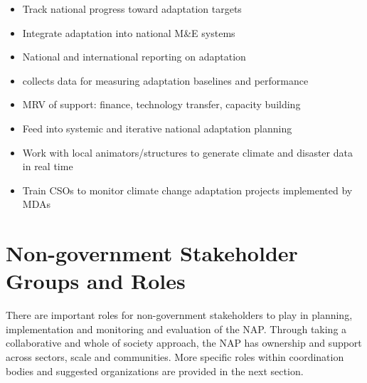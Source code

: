 \documentclass[
]{book}
\providecommand{\tightlist}{%
  \setlength{\itemsep}{0pt}\setlength{\parskip}{0pt}}
\begin{document}
\begin{itemize}
\tightlist
\item
  Track national progress toward adaptation targets
\item
  Integrate adaptation into national M\&E systems
\item
  National and international reporting on adaptation
\item
  collects data for measuring adaptation baselines and performance
\item
  MRV of support: finance, technology transfer, capacity building
\item
  Feed into systemic and iterative national adaptation planning
\item
  Work with local animators/structures to generate climate and disaster data in real time
\item
  Train CSOs to monitor climate change adaptation projects implemented by MDAs
\end{itemize}

\hypertarget{non-government-stakeholder-groups-and-roles}{%
\section{Non-government Stakeholder Groups and Roles}\label{non-government-stakeholder-groups-and-roles}}

There are important roles for non-government stakeholders to play in planning, implementation and monitoring and evaluation of the NAP. Through taking a collaborative and whole of society approach, the NAP has ownership and support across sectors, scale and communities. More specific roles within coordination bodies and suggested organizations are provided in the next section.
\end{document}
